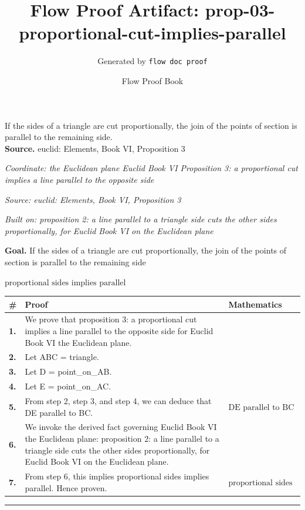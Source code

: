 \documentclass[11pt]{article}
\title{Flow Proof Artifact: prop-03-proportional-cut-implies-parallel}
\author{Generated by \texttt{flow doc proof}}
\date{Flow Proof Book}
\theoremstyle{definition}
\begin{document}
\maketitle
If the sides of a triangle are cut proportionally, the join of the points of section is parallel to the remaining side.\\[0.5em]
\textbf{Source.} euclid: Elements, Book VI, Proposition 3\\[0.5em]
\bigskip
{}\par
\smallskip\noindent\textit{Coordinate: the Euclidean plane \cdot Euclid Book VI \cdot Proposition 3: a proportional cut implies a line parallel to the opposite side}\par
\smallskip\noindent\textit{Source: euclid: Elements, Book VI, Proposition 3}\par
\smallskip\noindent\textit{Built on: proposition 2: a line parallel to a triangle side cuts the other sides proportionally, for Euclid Book VI on the Euclidean plane}\par
\medskip
\noindent\textbf{Goal.} If the sides of a triangle are cut proportionally, the join of the points of section is parallel to the remaining side\par
\noindent$\displaystyle \text{proportional sides implies parallel}$\par
\medskip
\noindent
\begin{tabular}{@{} >{\raggedright\arraybackslash}p{} >{\raggedright\arraybackslash}p{} >{\raggedleft\arraybackslash}p{} @{}}
\textbf{\#} & \textbf{Proof} & \textbf{Mathematics} \\
\midrule
\textbf{1.} & We prove that proposition 3: a proportional cut implies a line parallel to the opposite side for Euclid Book VI the Euclidean plane. & \\[0.45em]
\textbf{2.} & Let ABC = triangle. & \\[0.45em]
\textbf{3.} & Let D = point\_on\_AB. & \\[0.45em]
\textbf{4.} & Let E = point\_on\_AC. & \\[0.45em]
\textbf{5.} & From step 2, step 3, and step 4, we can deduce that DE parallel to BC. & $\displaystyle \text{DE parallel to BC}$ \\[0.45em]
\textbf{6.} & We invoke the derived fact governing Euclid Book VI the Euclidean plane: proposition 2: a line parallel to a triangle side cuts the other sides proportionally, for Euclid Book VI on the Euclidean plane. & \\[0.45em]
\textbf{7.} & From step 6, this implies proportional sides implies parallel. Hence proven. & $\displaystyle \text{proportional sides implies parallel}$ \\[0.45em]
\bottomrule
\end{tabular}
\label{thm:Geometry-Euclid Book VI-proposition_3_a_proportional_cut_implies_a_line_parallel_to_the_opposite_side}
\par\medskip\hrule
\end{document}
